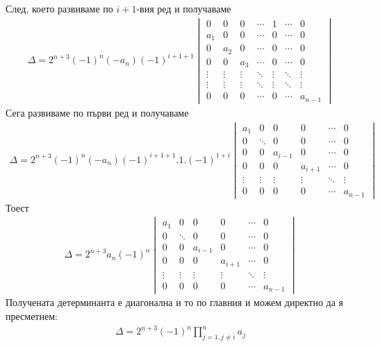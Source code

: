 \documentclass[a4paper, 12pt, oneside]{article}
\begin{document}
След, което развиваме по \(i + 1\)-вия ред и получаваме
\begin{align*}
\Delta = 2^{n + 3}(-1)^n (-a_n)(-1)^{i + 1 + 1}\begin{vmatrix}
    0      & 0      & 0      & \cdots & 1      & \cdots & 0      \\
    a_1    & 0      & 0      & \cdots & 0      & \cdots & 0      \\
    0      & a_2    & 0      & \cdots & 0      & \cdots & 0      \\
    0      & 0      & a_3    & \cdots & 0      & \cdots & 0      \\
    \vdots & \vdots & \vdots & \ddots & \vdots & \ddots & \vdots \\
    \vdots & \vdots & \vdots & \ddots & \vdots & \ddots & \vdots \\
    0      & 0      & 0      & \cdots & 0      & \cdots & a_{n - 1}
\end{vmatrix}
\end{align*}
Сега развиваме по първи ред и получаваме
\begin{align*}
\Delta = 2^{n + 3}(-1)^n (-a_n)(-1)^{i + 1 + 1}.1.(-1)^{1 + i}\begin{vmatrix}
    a_1 & 0 & 0 & 0 & \cdots & 0 \\
    0 & \ddots & 0 & 0 & \cdots & 0 \\
    0 & 0 & a_{i - 1} & 0 & \cdots & 0 \\
    0 & 0 & 0 & a_{i + 1} & \cdots & 0 \\
    \vdots & \vdots & \vdots & \vdots & \ddots & \vdots \\
    0 & 0 & 0 & 0 & \cdots & a_{n - 1}
\end{vmatrix}
\end{align*}
Тоест
\begin{align*}
\Delta = 2^{n + 3}a_n(-1)^n\begin{vmatrix}
    a_1 & 0 & 0 & 0 & \cdots & 0 \\
    0 & \ddots & 0 & 0 & \cdots & 0 \\
    0 & 0 & a_{i - 1} & 0 & \cdots & 0 \\
    0 & 0 & 0 & a_{i + 1} & \cdots & 0 \\
    \vdots & \vdots & \vdots & \vdots & \ddots & \vdots \\
    0 & 0 & 0 & 0 & \cdots & a_{n - 1}
\end{vmatrix}
\end{align*}
Получената детерминанта е диагонална и то по главния и можем директно да я пресметнем:
\begin{align*}
\Delta = 2^{n + 3}(-1)^n\displaystyle\prod_{j = 1, j \neq i}^n a_j
\end{align*}
\end{document}
